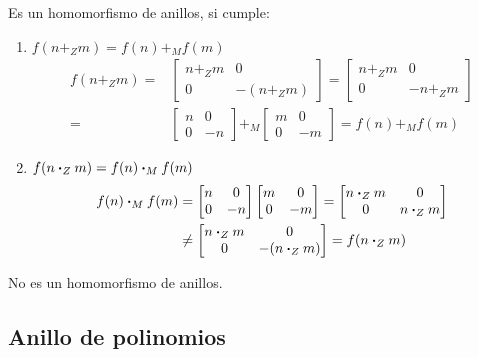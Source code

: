 \begin{fmd-example}
	Es un homomorfismo de anillos, si cumple:
	\begin{enumerate}[label=\roman*)]
		\item $f(n +_Z m) = f(n) +_M f(m)$ \quad \cmark
		\[ \begin{split}
			f(n +_Z m) =& \begin{bmatrix}
				n +_Z m & 0 \\
				0 & -(n +_Z m)
			\end{bmatrix} = \begin{bmatrix}
				n +_Z m & 0 \\
				0 & -n +_Z m
			\end{bmatrix} \\[2mm] =&
			\begin{bmatrix}
				n & 0 \\
				0 & -n
			\end{bmatrix} +_M \begin{bmatrix}
				m & 0 \\
				0 & -m
			\end{bmatrix} = f(n) +_M f(m)
		\end{split} \]
		\item $f(n \boldsymbol{\cdot}_Z m) = f(n) \boldsymbol{\cdot}_M f(m)$ \quad \xmark
		\[ \begin{split}
			f(n) \boldsymbol{\cdot}_M f(m) &= \begin{bmatrix}
				n & 0 \\
				0 & -n
			\end{bmatrix} \begin{bmatrix}
				m & 0 \\
				0 & -m
			\end{bmatrix} = \begin{bmatrix}
				n \boldsymbol{\cdot}_Z m & 0 \\
				0 & n \boldsymbol{\cdot}_Z m
			\end{bmatrix} \\
			& \ne \begin{bmatrix}
				n \boldsymbol{\cdot}_Z m & 0 \\
				0 & - (n \boldsymbol{\cdot}_Z m)
			\end{bmatrix} = f(n \boldsymbol{\cdot}_Z m)
		\end{split} \]
	\end{enumerate}
	No es un homomorfismo de anillos.
\end{fmd-example}

\subsection{Anillo de polinomios} \label{sec:polis}

